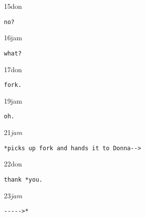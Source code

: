\documentclass[output=paper,nonflat,modfont,draft]{langsci/langscibook}
\begin{document}
\begin{transbox}{15}{don}
\begin{verbatim}
no?
\end{verbatim}
\end{transbox}

\begin{transbox}{16}{jam}
\begin{verbatim}
what?
\end{verbatim}
\end{transbox}

\begin{mdframedkendrick}[style=firstfoc]
\begin{transbox}{17}{don}
\begin{verbatim}
fork.
\end{verbatim}
\end{transbox}
\end{mdframedkendrick}\vspace{-5mm}


\begin{transbox}{19}{jam}
\begin{verbatim}
oh.
\end{verbatim}
\end{transbox}


\begin{mdframedkendrick}[style=secondfoc]
\begin{transbox}{21}{\textit{jam}}
\begin{verbatim}
*picks up fork and hands it to Donna-->
\end{verbatim}
\end{transbox}
\end{mdframedkendrick}\vspace{-5mm}

\begin{transbox}{22}{don}
\begin{verbatim}
thank *you.
\end{verbatim}
\end{transbox}

\begin{transbox}{23}{\textit{jam}}
\begin{verbatim}
----->*
\end{verbatim}
\end{transbox}\bigskip
\end{document}
